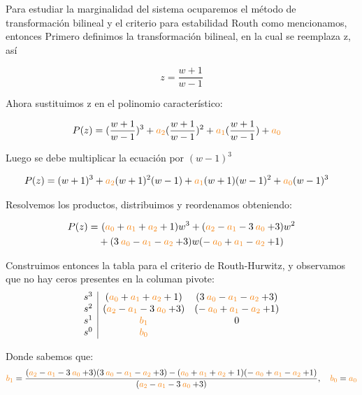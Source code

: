 Para estudiar la marginalidad del sistema ocuparemos el método de transformación bilineal y 
el criterio para estabilidad Routh como mencionamos, entonces
Primero definimos la transformación bilineal, en la cual se reemplaza z, así 

\begin{equation}
    z= \frac{w+1}{w-1}
\end{equation}

Ahora sustituimos z en el polinomio característico:

\begin{align}
    P(z) = (\frac{w+1}{w-1})^3 + \nara{a_2} (\frac{w+1}{w-1})^2 + \nara{a_1} (\frac{w+1}{w-1}) + \nara{a_0} &
\end{align}

Luego se debe multiplicar la ecuación por $( w-1)^3$

\begin{align}
    P(z) =  ({w+1})^3 + \nara{a_2} ({w+1})^2 (w-1) + \nara{a_1} ({w+1})(w-1)^2 + \nara{a_0}(w-1)^3 &
\end{align}

Resolvemos los productos, distribuimos y reordenamos obteniendo:

\begin{align}
    P(z) = &\ (\nara{a_0} + \nara{a_1} + \nara{a_2} + 1) w^3 
    + (\nara{a_2} - \nara{a_1} - 3\nara{a_0} + 3) w^2 \nonumber \\ 
    &+ (3\nara{a_0} - \nara{a_1} - \nara{a_2} + 3) w 
    (- \nara{a_0} + \nara{a_1} - \nara{a_2} + 1)
\end{align}

Construimos entonces la tabla para el criterio de Routh-Hurwitz, y observamos
que no hay ceros presentes en la columan pivote:
\begin{equation}
  \begin{array}{c|cc}
    s^3 & (\nara{a_0} + \nara{a_1} + \nara{a_2} + 1) & (3\nara{a_0} - \nara{a_1} - \nara{a_2} + 3)  \\
    s^2 & (\nara{a_2} - \nara{a_1} - 3\nara{a_0} + 3)  & (- \nara{a_0} + \nara{a_1} - \nara{a_2} + 1) \\
    s^1 & \nara{b_1} & 0 \\
    s^0 & \nara{b_0} & 
  \end{array}
\end{equation}

Donde sabemos que:
\begin{align}
  \nara{b_1} = \frac{(\nara{a_2} - \nara{a_1} - 3\nara{a_0} + 3) (3\nara{a_0} - \nara{a_1} - \nara{a_2} + 3) - (\nara{a_0} + \nara{a_1} + \nara{a_2} + 1)(- \nara{a_0} + \nara{a_1} - \nara{a_2} + 1)}{(\nara{a_2} - \nara{a_1} - 3\nara{a_0} + 3)},\quad
  \nara{b_0} = \nara{a_0}
\end{align}


